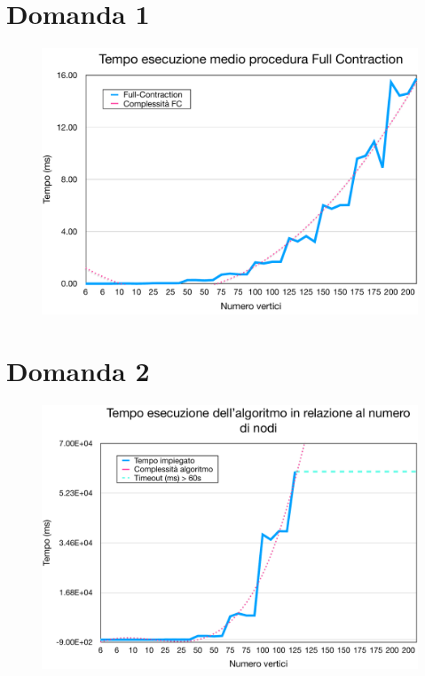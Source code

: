 \documentclass[a4paper]{article}
\begin{document}
\section{Domanda 1}
\begin{figure}[H]
	\centering
	\includegraphics[width=17cm]{fullcontraction}
	\label{fig:fullcontraction}
\end{figure}

\section{Domanda 2}
\begin{figure}[H]
	\centering
	\includegraphics[width=17cm]{tempoesecvsnumnodi}
	\label{fig:tempoesecvsnumnodi}
\end{figure}
\end{document}
